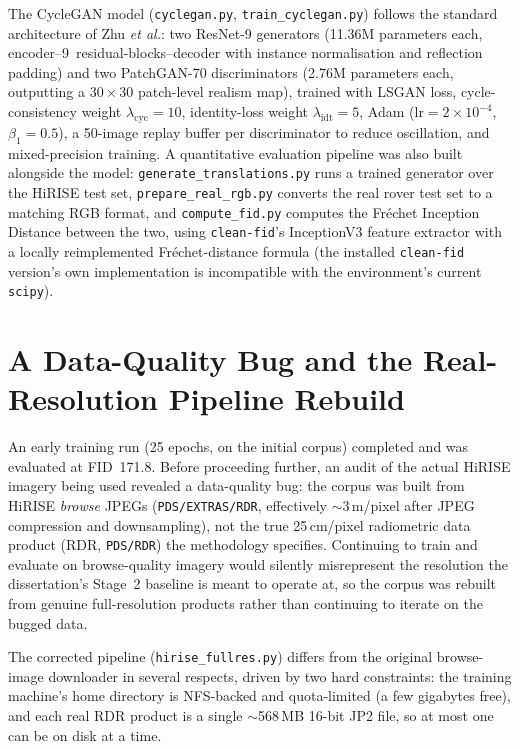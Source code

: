 The CycleGAN model (\texttt{cyclegan.py}, \texttt{train\_cyclegan.py}) follows the standard architecture of Zhu \textit{et al.}: two ResNet-9 generators (11.36M parameters each, encoder--9~residual-blocks--decoder with instance normalisation and reflection padding) and two PatchGAN-70 discriminators (2.76M parameters each, outputting a $30{\times}30$ patch-level realism map), trained with LSGAN loss, cycle-consistency weight $\lambda_{\mathrm{cyc}}=10$, identity-loss weight $\lambda_{\mathrm{idt}}=5$, Adam ($\mathrm{lr}=2{\times}10^{-4}$, $\beta_1=0.5$), a 50-image replay buffer per discriminator to reduce oscillation, and mixed-precision training. A quantitative evaluation pipeline was also built alongside the model: \texttt{generate\_translations.py} runs a trained generator over the HiRISE test set, \texttt{prepare\_real\_rgb.py} converts the real rover test set to a matching RGB format, and \texttt{compute\_fid.py} computes the Fr\'{e}chet Inception Distance between the two, using \texttt{clean-fid}'s InceptionV3 feature extractor with a locally reimplemented Fr\'{e}chet-distance formula (the installed \texttt{clean-fid} version's own implementation is incompatible with the environment's current \texttt{scipy}).

\section{A Data-Quality Bug and the Real-Resolution Pipeline Rebuild}
\label{sec:fullres-pipeline}

An early training run (25 epochs, on the initial corpus) completed and was evaluated at FID~171.8. Before proceeding further, an audit of the actual HiRISE imagery being used revealed a data-quality bug: the corpus was built from HiRISE \emph{browse} JPEGs (\texttt{PDS/EXTRAS/RDR}, effectively $\sim$3\,m/pixel after JPEG compression and downsampling), not the true 25\,cm/pixel radiometric data product (RDR, \texttt{PDS/RDR}) the methodology specifies. Continuing to train and evaluate on browse-quality imagery would silently misrepresent the resolution the dissertation's Stage~2 baseline is meant to operate at, so the corpus was rebuilt from genuine full-resolution products rather than continuing to iterate on the bugged data.

The corrected pipeline (\texttt{hirise\_fullres.py}) differs from the original browse-image downloader in several respects, driven by two hard constraints: the training machine's home directory is NFS-backed and quota-limited (a few gigabytes free), and each real RDR product is a single $\sim$568\,MB 16-bit JP2 file, so at most one can be on disk at a time.

